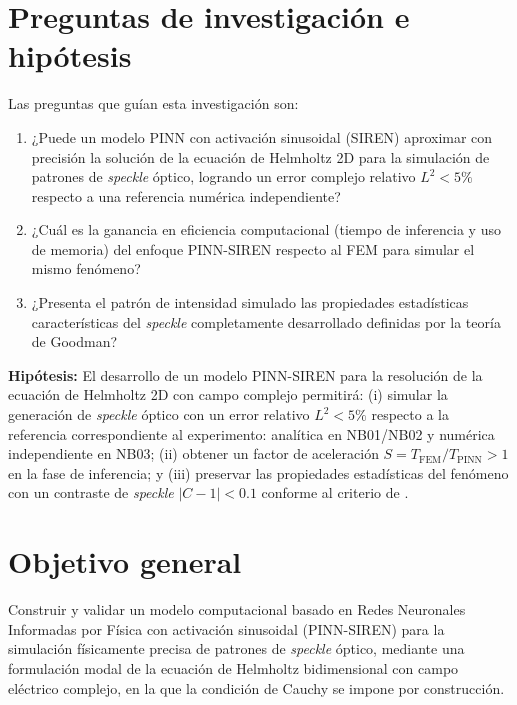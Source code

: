 \section{Preguntas de investigación e hipótesis}

Las preguntas que guían esta investigación son:

\begin{enumerate}
    \item ¿Puede un modelo PINN con activación sinusoidal (SIREN) aproximar
    con precisión la solución de la ecuación de Helmholtz 2D para la simulación
    de patrones de \textit{speckle} óptico, logrando un error complejo relativo
    $L^2 < 5\%$ respecto a una referencia numérica independiente?

    \item ¿Cuál es la ganancia en eficiencia computacional (tiempo de inferencia
    y uso de memoria) del enfoque PINN-SIREN respecto al FEM para simular el
    mismo fenómeno?

    \item ¿Presenta el patrón de intensidad simulado las propiedades estadísticas
    características del \textit{speckle} completamente desarrollado definidas por
    la teoría de Goodman?
\end{enumerate}

\textbf{Hipótesis:} El desarrollo de un modelo PINN-SIREN para la resolución de
la ecuación de Helmholtz 2D con campo complejo permitirá:
(i) simular la generación de \textit{speckle} óptico con un error relativo
    $L^2 < 5\%$ respecto a la referencia correspondiente al experimento:
    analítica en NB01/NB02 y numérica independiente en NB03;
(ii) obtener un factor de aceleración $S = T_\text{FEM} / T_\text{PINN} > 1$ en
la fase de inferencia; y
(iii) preservar las propiedades estadísticas del fenómeno con un contraste de
\textit{speckle} $|C - 1| < 0.1$ conforme al criterio de \textcite{goodman2007speckle}.

\section{Objetivo general}

Construir y validar un modelo computacional basado en Redes Neuronales
Informadas por Física con activación sinusoidal (PINN-SIREN) para la simulación
físicamente precisa de patrones de \textit{speckle} óptico, mediante una
formulación modal de la ecuación de Helmholtz bidimensional con campo eléctrico
complejo, en la que la condición de Cauchy se impone por construcción.

